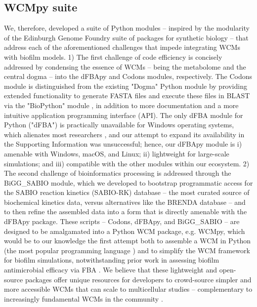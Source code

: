 \subsection*{WCMpy suite}
We, therefore, developed a suite of Python modules -- inspired by the modularity of the Edinburgh Genome Foundry suite of packages \cite{Codons2021TheFoundry} for synthetic biology -- that address each of the aforementioned challenges that impede integrating WCMs with biofilm models. 1) The first challenge of code efficiency is concisely addressed by condensing the essence of WCMs -- being the metabolome and the central dogma -- into the dFBApy and Codons modules, respectively. The Codons module is distinguished from the existing "Dogma" Python module by providing extended functionality to generate FASTA files and execute these files in BLAST via the "BioPython" module \cite{Cock2009Biopython:Bioinformatics}, in addition to more documentation and a more intuitive application programming interface (API). The only dFBA module for Python ("dFBA") is practically unavailable for Windows operating systems, which alienates most researchers \cite{StatistaMarket2021}, and our attempt to expand its availability in the Supporting Information was unsuccessful; hence, our dFBApy module is i) amenable with Windows, macOS, and Linux; ii) lightweight for large-scale simulations; and iii) compatible with the other modules within our ecosystem. 2) The second challenge of bioinformatics processing is addressed through the BiGG\_SABIO module, which we developed to bootstrap programmatic access for the SABIO reaction kinetics (SABIO-RK) database \cite{Wittig2012} -- the most curated source of biochemical kinetics data, versus alternatives like the BRENDA database \cite{Chang2021} -- and to then refine the assembled data into a form that is directly amenable with the dFBApy package. These scripts -- Codons, dFBApy, and BiGG\_SABIO -- are designed to be amalgamated into a Python WCM package, e.g. WCMpy, which would be to our knowledge the first attempt both to assemble a WCM in Python (the most popular programming language \cite{TIOBE2022}) and to simplify the WCM framework for biofilm simulations, notwithstanding prior work in assessing biofilm antimicrobial efficacy via FBA \cite{Sigurdsson2012ABiofilm}. We believe that these lightweight and open-source packages offer unique resources for developers to crowd-source simpler and more accessible WCMs that can scale to multicellular studies -- complementary to increasingly fundamental WCMs \cite{Maritan2022BuildingCell} in the community \cite{Goldberg2018EmergingMethods,Shepelin2020BenchmarkingMetabolism}. 

